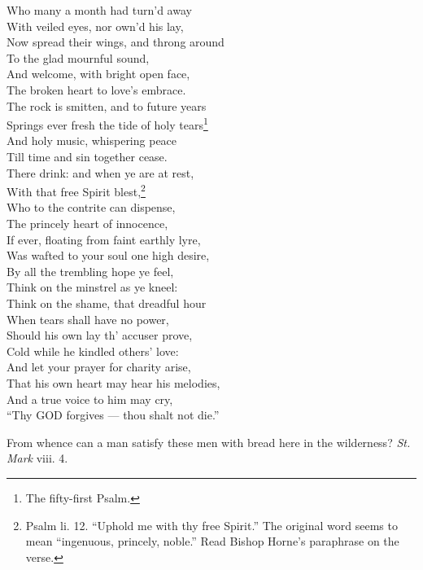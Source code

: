  Who many a month had turn’d away \\
 With veiled eyes, nor own’d his lay, \\
  Now spread their wings, and throng around \\
 To the glad mournful sound, \\
 And welcome, with bright open face, \\
 The broken heart to love’s embrace. \\
 The rock is smitten, and to future years \\
 Springs ever fresh the tide of holy tears\footnote{The fifty-first Psalm.} \\
 And holy music, whispering peace \\
 Till time and sin together cease. \\
  There drink: and when ye are at rest, \\
 With that free Spirit blest,\footnote{Psalm li. 12. “Uphold me with thy free Spirit.” The original word seems to mean “ingenuous, princely, noble.” Read Bishop Horne’s paraphrase on the verse.} \\
 Who to the contrite can dispense, \\
 The princely heart of innocence, \\
 If ever, floating from faint earthly lyre, \\
 Was wafted to your soul one high desire, \\
 By all the trembling hope ye feel, \\
 Think on the minstrel as ye kneel: \\
  Think on the shame, that dreadful hour \\
 When tears shall have no power, \\
 Should his own lay th’ accuser prove, \\
 Cold while he kindled others’ love: \\
 And let your prayer for charity arise, \\
 That his own heart may hear his melodies, \\
 And a true voice to him may cry, \\
 “Thy \textsc{GOD} forgives — thou shalt not die.”\\


From whence can a man satisfy these men with bread here in the wilderness? \emph{St. Mark} viii. 4.

